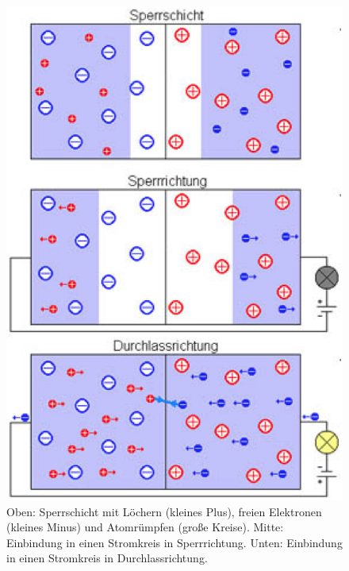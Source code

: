 \documentclass[12pt,a4paper,twopage]{article}
\begin{document}
\begin{center}
\begin{figure}[H]
\includegraphics[scale=0.4]{sperrschicht.eps}
\caption{Oben: Sperrschicht mit Löchern (kleines Plus), freien Elektronen (kleines Minus) und Atomrümpfen (große Kreise). Mitte: Einbindung in einen Stromkreis in Sperrrichtung. Unten: Einbindung in einen Stromkreis in Durchlassrichtung.}
\label{fig:sperrschicht}
\end{figure}
\end{center}
\end{document}
